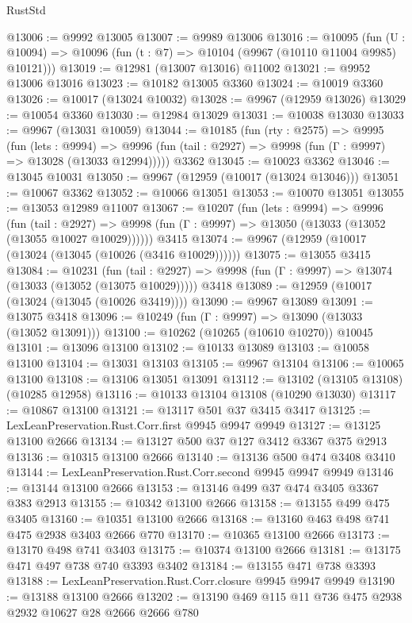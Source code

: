 \begin{lexlean}{RustStd}
\begin{coremodule}
@13006 := @9992 @13005
@13007 := @9989 @13006
@13016 := @10095
    (fun (U : @10094) => @10096 (fun (t : @7) => @10104 (@9967 (@10110 @11004 @9985) @10121)))
@13019 := @12981 (@13007 @13016) @11002
@13021 := @9952 @13006 @13016
@13023 := @10182 @13005 @3360
@13024 := @10019 @3360
@13026 := @10017 (@13024 @10032)
@13028 := @9967 (@12959 @13026)
@13029 := @10054 @3360
@13030 := @12984 @13029
@13031 := @10038 @13030
@13033 := @9967 (@13031 @10059)
@13044 := @10185
    (fun (rty : @2575) =>
    @9995
      (fun (lets : @9994) =>
      @9996 (fun (tail : @2927) => @9998 (fun (Γ : @9997) => @13028 (@13033 @12994)))))
    @3362
@13045 := @10023 @3362
@13046 := @13045 @10031
@13050 := @9967 (@12959 (@10017 (@13024 @13046)))
@13051 := @10067 @3362
@13052 := @10066 @13051
@13053 := @10070 @13051
@13055 := @13053 @12989 @11007
@13067 := @10207
    (fun (lets : @9994) =>
    @9996
      (fun (tail : @2927) =>
      @9998 (fun (Γ : @9997) => @13050 (@13033 (@13052 (@13055 @10027 @10029))))))
    @3415
@13074 := @9967 (@12959 (@10017 (@13024 (@13045 (@10026 (@3416 @10029))))))
@13075 := @13055 @3415
@13084 := @10231
    (fun (tail : @2927) => @9998 (fun (Γ : @9997) => @13074 (@13033 (@13052 (@13075 @10029)))))
    @3418
@13089 := @12959 (@10017 (@13024 (@13045 (@10026 @3419))))
@13090 := @9967 @13089
@13091 := @13075 @3418
@13096 := @10249 (fun (Γ : @9997) => @13090 (@13033 (@13052 @13091)))
@13100 := @10262 (@10265 (@10610 @10270)) @10045
@13101 := @13096 @13100
@13102 := @10133 @13089
@13103 := @10058 @13100
@13104 := @13031 @13103
@13105 := @9967 @13104
@13106 := @10065 @13100
@13108 := @13106 @13051 @13091
@13112 := @13102 (@13105 @13108) (@10285 @12958)
@13116 := @10133 @13104 @13108 (@10290 @13030)
@13117 := @10867 @13100
@13121 := @13117 @501 @37 @3415 @3417
@13125 := LexLeanPreservation.Rust.Corr.first @9945 @9947 @9949
@13127 := @13125 @13100 @2666
@13134 := @13127 @500 @37 @127 @3412 @3367 @375 @2913
@13136 := @10315 @13100 @2666
@13140 := @13136 @500 @474 @3408 @3410
@13144 := LexLeanPreservation.Rust.Corr.second @9945 @9947 @9949
@13146 := @13144 @13100 @2666
@13153 := @13146 @499 @37 @474 @3405 @3367 @383 @2913
@13155 := @10342 @13100 @2666
@13158 := @13155 @499 @475 @3405
@13160 := @10351 @13100 @2666
@13168 := @13160 @463 @498 @741 @475 @2938 @3403 @2666 @770
@13170 := @10365 @13100 @2666
@13173 := @13170 @498 @741 @3403
@13175 := @10374 @13100 @2666
@13181 := @13175 @471 @497 @738 @740 @3393 @3402
@13184 := @13155 @471 @738 @3393
@13188 := LexLeanPreservation.Rust.Corr.closure @9945 @9947 @9949
@13190 := @13188 @13100 @2666
@13202 := @13190 @469 @115 @11 @736 @475 @2938 @2932 @10627 @28 @2666 @2666 @780

\end{coremodule}
\end{lexlean}
